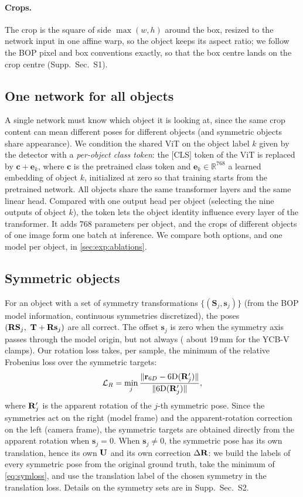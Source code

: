 \paragraph{Crops.}
The crop is the square of side $\max(w, h)$ around the box, resized to the network input in one
affine warp, so the object keeps its aspect ratio; we follow the BOP pixel and box conventions
exactly, so that the box centre lands on the crop centre (Supp.~Sec.~S1).

\subsection{One network for all objects}
\label{sec:method:conditioning}
A single network must know which object it is looking at, since the same crop content can mean
different poses for different objects (and symmetric objects share appearance). We condition the
shared ViT on the object label $k$ given by the detector with a \emph{per-object class token}: the
[CLS] token of the ViT is replaced by $\mathbf{c} + \mathbf{e}_k$, where $\mathbf{c}$ is the
pretrained class token and $\mathbf{e}_k \in \mathbb{R}^{768}$ a learned embedding of object $k$,
initialized at zero so that training starts from the pretrained network. All objects share the
same transformer layers and the same linear head. Compared with one output head per object
(selecting the nine outputs of object $k$), the token lets the object identity influence every
layer of the transformer. It adds $768$ parameters per object, and the crops of
different objects of one image form one batch at inference. We compare both options, and one model
per object, in \cref{sec:exp:ablations}.

\subsection{Symmetric objects}
\label{sec:method:symmetry}
For an object with a set of symmetry transformations $\{(\mathbf{S}_j, \mathbf{s}_j)\}$ (from the
BOP model information, continuous symmetries discretized), the poses $(\mathbf{R}\mathbf{S}_j,\ \mathbf{T} +
\mathbf{R}\mathbf{s}_j)$ are all correct. The offset $\mathbf{s}_j$ is zero when the symmetry axis
passes through the model origin, but not always (\eg{} about 19\,mm for the YCB-V clamps). Our
rotation loss takes, per sample, the minimum of the relative Frobenius loss over the symmetric
targets:
\begin{equation}
  \mathcal{L}_R = \min_j \frac{\| \mathbf{r}_{6D} - \mathrm{6D}(\mathbf{R}'_j) \|}
  {\| \mathrm{6D}(\mathbf{R}'_j) \|},
  \label{eq:symloss}
\end{equation}
where $\mathbf{R}'_j$ is the apparent rotation of the $j$-th symmetric pose. Since the symmetries act on
the right (model frame) and the apparent-rotation correction on the left (camera frame), the
symmetric targets are obtained directly from the apparent rotation when $\mathbf{s}_j = 0$. When
$\mathbf{s}_j \neq 0$, the symmetric pose has its own translation, hence its own $\mathbf{U}$ and its own
correction $\Delta\mathbf{R}$: we build the labels of every symmetric pose from the original ground truth,
take the minimum of \cref{eq:symloss}, and use the translation label of the chosen symmetry in the
translation loss. Details on the symmetry sets are in Supp.~Sec.~S2.

